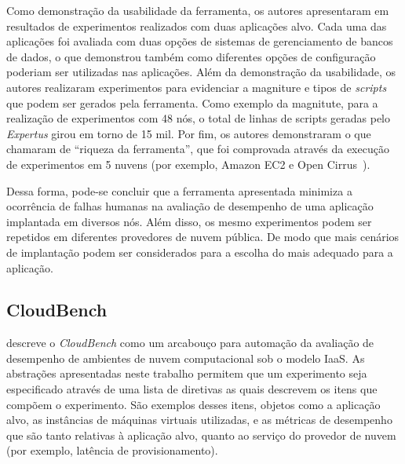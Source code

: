 Como demonstração da usabilidade da ferramenta, os autores apresentaram em~\cite{jayasinghe2012} resultados de experimentos realizados com duas aplicações alvo. Cada uma das aplicações foi avaliada com duas opções de sistemas de gerenciamento de bancos de dados, o que demonstrou também como diferentes opções de configuração poderiam ser utilizadas nas aplicações. Além da demonstração da usabilidade, os autores realizaram experimentos para evidenciar a magniture e tipos de \textit{scripts} que podem ser gerados pela ferramenta. Como exemplo da magnitute, para a realização de experimentos com 48 nós, o total de linhas de scripts geradas pelo \textit{Expertus} girou em torno de 15 mil. Por fim, os autores demonstraram o que chamaram de ``riqueza da ferramenta'', que foi comprovada através da execução de experimentos em 5 nuvens (por exemplo, Amazon EC2 e Open Cirrus~\cite{avetisyan2010open}).

Dessa forma, pode-se concluir que a ferramenta apresentada minimiza a ocorrência de falhas humanas na avaliação de desempenho de uma aplicação implantada em diversos nós. Além disso, os mesmo experimentos podem ser repetidos em diferentes provedores de nuvem pública. De modo que mais cenários de implantação podem ser considerados para a escolha do mais adequado para a aplicação.

\subsection{CloudBench}
\cite{silva2013cloudbench} descreve o \textit{CloudBench} como um arcabouço para automação da avaliação de desempenho de ambientes de nuvem computacional sob o modelo IaaS. As abstrações apresentadas neste trabalho permitem que um experimento seja especificado através de uma lista de diretivas as quais descrevem os itens que compõem o experimento. São exemplos desses itens, objetos como a aplicação alvo, as instâncias de máquinas virtuais utilizadas, e as métricas de desempenho que são tanto relativas à aplicação alvo, quanto ao serviço do provedor de nuvem (por exemplo, latência de provisionamento).

